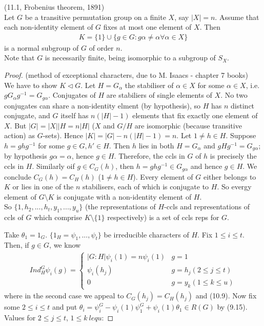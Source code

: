 \documentclass[a4paper]{article}
\begin{document}
\begin{thm} (11.1, Frobenius theorem, 1891)\\
Let $G$ be a transitive permutation group on a finite $X$, say $|X|=n$. Assume that each non-identity element of $G$ fixes at most one element of $X$. Then
\begin{equation*}
\begin{aligned}
K =  \{1\} \cup \{g \in G: g \alpha \neq \alpha \forall \alpha \in X\}
\end{aligned}
\end{equation*}
is a normal subgroup of $G$ of order $n$.\\
Note that $G$ is necessarily finite, being isomorphic to a subgroup of $S_X$.
\begin{proof}
(method of exceptional characters, due to M. Isaacs - chapter 7 books)\\
We have to show $K \triangleleft G$. Let $H = G_\alpha$ the stabiliser of $\alpha \in X$ for some $\alpha \in X$, i.e. $g G_\alpha g^{-1} = G_{g\alpha}$. Conjugates of $H$ are stabiliers of single elements of $X$. No two conjugates can share a non-identity elment (by hypothesis), so $H$ has $n$ distinct conjugate, and $G$ itself has $n(|H|-1)$ elements that fix exactly one element of $X$. But $|G| = |X||H = n|H|$ ($X$ and $G/H$ are isomorphic (because transitive action) as $G$-sets). Hence $|K| = |G| -n(|H|-1) = n$. Let $1 \neq h \in H$. Suppose $h = ghg^{-1}$ for some $g \in G, h' \in H$. Then $h$ lies in both $H = G_\alpha$ and $gHg^{-1} = G_{g\alpha}$; by hypothesis $g\alpha = \alpha$, hence $g \in H$. Therefore, the ccls in $G$ of $h$ is precisely the ccls in $H$. Similarly oif $g \in C_G(h)$, then $h=ghg^{-1} \in G_{g\alpha}$ and hence $g \in H$. We conclude $C_G(h) = C_H(h)$ ($1 \neq h \in H$). Every element of $G$ either belongs to $K$ or lies in one of the $n$ stabilisers, each of which is conjugate to $H$. So evergy element of $G \setminus K$ is conjugate with a non-identity element of $H$.\\
So $\{1,h_2,...,h_t,y_1,...,y_u\}$ (the representations of $H$-ccls and representations of ccls of $G$ which comprise $K \setminus \{1\}$ respectively) is a set of ccls reps for $G$.

Take $\theta_1 = 1_G$. $\{1_H = \psi_1,...,\psi_t\}$ be irreducible characters of $H$. Fix $1 \leq i \leq t$. Then, if $g \in G$, we know
\begin{equation*}
\begin{aligned}
Ind_H^G \psi_i (g) = \left\{\begin{array}{ll}
|G:H| \psi_i(1) = n\psi_i(1) & g=1\\
\psi_i (h_j) & g=h_j (2 \leq j \leq t)\\
0 & g=y_k (1 \leq k \leq u)
\end{array}
\right.
\end{aligned}
\end{equation*}
where in the second case we appeal to $C_G(h_j) = C_H(h_j)$ and (10.9). Now fix some $2 \leq i \leq t$ and put $\theta_i = \psi_i^G - \psi_i(1) \psi_1^G + \psi_i(1) \theta_1 \in R(G)$ by (9.15). Values for $2 \leq j \leq t$, $1 \leq k\ leq u$:


\end{proof}
\end{thm}
\end{document}
